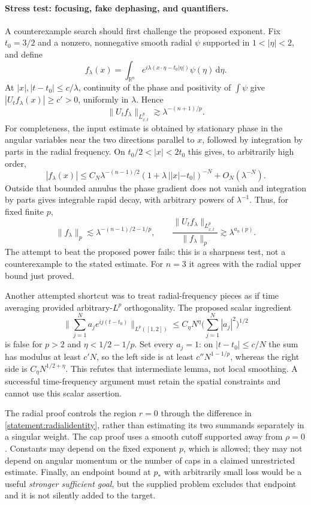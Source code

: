 \documentclass[11pt]{article}
\newcommand{\R}{\mathbb{R}}
\newcommand{\dd}{\,\mathrm d}
\begin{document}
	\paragraph{Stress test: focusing, fake dephasing, and quantifiers.}
	A counterexample search should first challenge the proposed exponent.
	Fix $t_0=3/2$ and a nonzero, nonnegative smooth radial $\psi$ supported
	in $1<|\eta|<2$, and define
	\[
	f_\lambda(x)=\int_{\R^n}
	e^{i\lambda(x\cdot\eta-t_0|\eta|)}\psi(\eta)\dd\eta.
	\]
	At $|x|,|t-t_0|\leq c/\lambda$, continuity of the phase and positivity
	of $\int\psi$ give $|U_tf_\lambda(x)|\geq c'>0$, uniformly in
	$\lambda$. Hence
	\[
	\|U_tf_\lambda\|_{L^p_{x,t}}\gtrsim\lambda^{-(n+1)/p}.
	\]
	For completeness, the input estimate is obtained by stationary phase in
	the angular variables near the two directions parallel to $x$, followed
	by integration by parts in the radial frequency. On
	$t_0/2<|x|<2t_0$ this gives, to arbitrarily high order,
	\[
	|f_\lambda(x)|\leq C_N\lambda^{-(n-1)/2}
	(1+\lambda\,||x|-t_0|)^{-N}+O_N(\lambda^{-N}).
	\]
	Outside that bounded annulus the phase gradient does not vanish and
	integration by parts gives integrable rapid decay, with arbitrary
	powers of $\lambda^{-1}$. Thus, for fixed finite $p$,
	\[
	\|f_\lambda\|_p\lesssim
	\lambda^{-(n-1)/2-1/p},\qquad
	\frac{\|U_tf_\lambda\|_{L^p_{x,t}}}{\|f_\lambda\|_p}
	\gtrsim\lambda^{a_n(p)}.
	\]
	The attempt to beat the proposed power fails: this is a sharpness test,
	not a counterexample to the stated estimate. For $n=3$ it agrees with
	the radial upper bound just proved.
	
	Another attempted shortcut was to treat radial-frequency pieces as if
	time averaging provided arbitrary-$L^p$ orthogonality. The proposed
	scalar ingredient
	\[
	\Big\|\sum_{j=1}^{N}a_je^{ij(t-t_0)}\Big\|_{L^p([1,2])}
	\leq C_\eta N^\eta\Big(\sum_{j=1}^{N}|a_j|^2\Big)^{1/2}
	\]
	is false for $p>2$ and $\eta<1/2-1/p$. Set every $a_j=1$:
	on $|t-t_0|\leq c/N$ the sum has modulus at least $c'N$, so the
	left side is at least $c''N^{1-1/p}$, whereas the right side is
	$C_\eta N^{1/2+\eta}$. This refutes that intermediate lemma, not
	local smoothing. A successful time-frequency argument must retain the
	spatial constraints and cannot use this scalar assertion.
	
	The radial proof controls the region $r=0$ through the difference in
	\eqref{statement:radialidentity}, rather than estimating its two summands
	separately in a singular weight. The cap proof uses a smooth cutoff
	supported away from $\rho=0$. Constants may depend on the fixed exponent
	$p$, which is allowed; they may not depend on angular momentum or the
	number of caps in a claimed unrestricted estimate. Finally, an
	endpoint bound at $p_*$ with arbitrarily small loss would be a useful
	\emph{stronger sufficient goal}, but the supplied problem excludes that
	endpoint and it is not silently added to the target.
	
\end{document}
